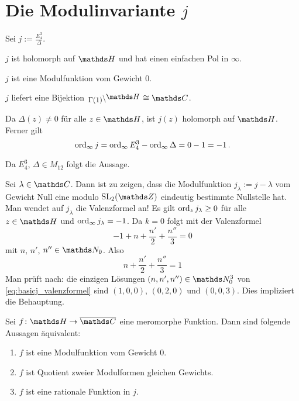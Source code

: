 \section[Die Modulinvariante \texorpdfstring{$j$}{j}]{Die Modulinvariante {\boldmath $j$}}

\begin{defi}
Sei $j := \frac{E_4^3}{\Delta}$.
\end{defi}

\begin{satz-list}\label{satz:j_eigenschaften}
	\item $j$ ist holomorph auf $\HH$ und hat einen einfachen Pol in $\infty$.
	\item $j$ ist eine Modulfunktion vom Gewicht $0$.
	\item $j$ liefert eine Bijektion $\linksmodulo{\Gamma(1)}{\HH} \cong \CC$.
\end{satz-list}

\begin{bewe-list}
	\item  Da $\Delta(z) \not= 0$ für alle $z\in\HH$, ist $j(z)$ holomorph auf $\HH$.
	Ferner gilt
	\[
	\operatorname{ord}_\infty j = \operatorname{ord}_\infty E_4^3 - \operatorname{ord}_\infty \Delta = 0 - 1 = -1
	\,.
	\]
	\item Da $E_4^3$, $\Delta \in M_{12}$ folgt die Aussage.
	\item Sei $\lambda \in \CC$. Dann ist zu zeigen, dass die Modulfunktion $j_\lambda := j - \lambda$ vom Gewicht Null eine modulo $\SL_2(\ZZ)$ eindeutig bestimmte Nullstelle hat.
	Man wendet auf $j_\lambda$ die Valenzformel an!
	Es gilt $\operatorname{ord}_z j_\lambda \geq 0$ für alle $z\in\HH$ und $\operatorname{ord}_\infty j_\lambda = -1$.
	Da $k = 0$ folgt mit der Valenzformel
	\[
	-1 + n + \frac{n'}{2} + \frac{n''}{3} = 0
	\]
	mit $n$, $n'$, $n'' \in \NN_0$.
	Also
	\begin{equation}\label{eq:basicj_valenzformel}
	n + \frac{n'}{2} + \frac{n''}{3} = 1
	\end{equation}
	Man prüft nach: die einzigen Lösungen $(n,n',n'') \in \NN_0^3$ von \eqref{eq:basicj_valenzformel} sind $(1,0,0)$, $(0,2,0)$ und $(0,0,3)$.
	Dies impliziert die Behauptung.
\end{bewe-list}

\begin{satz}\label{satz:charakterisierung_modulfunktion_0}
	Sei $f\colon \HH \to \closure{\CC}$ eine meromorphe Funktion. Dann sind folgende Aussagen äquivalent:
	\begin{enumerate}
		\item $f$ ist eine Modulfunktion vom Gewicht 0.
		\item $f$ ist Quotient zweier Modulformen gleichen Gewichts.
		\item $f$ ist eine rationale Funktion in $j$.
	\end{enumerate}
\end{satz}

